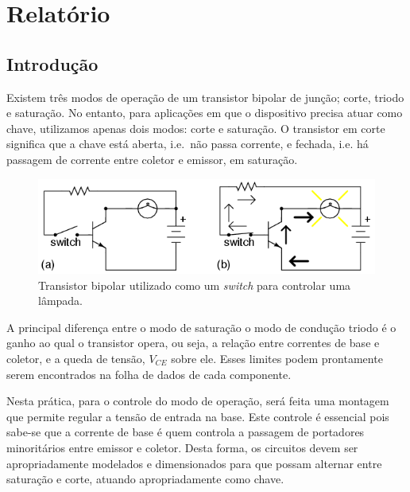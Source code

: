 \documentclass[12pt,a4paper]{article}
\begin{document}
\setcounter{figure}{1}
\setcounter{section}{2}
\setcounter{page}{6}
\section{Relatório}
\subsection{Introdução}
Existem três modos de operação de um transistor bipolar de junção; corte, triodo e saturação. No entanto, para aplicações 
em que o dispositivo precisa atuar como chave, utilizamos apenas dois modos: corte e saturação. O transistor em corte
significa que a chave está aberta, i.e.\ não passa corrente,  e fechada, i.e. há passagem de corrente entre coletor e emissor, em saturação.

\begin{figure}[htpb]
  \centering
  \includegraphics[width=0.8\linewidth]{./img/switch.png}
  \caption{Transistor bipolar utilizado como um \emph{switch} para controlar uma lâmpada.}
  \label{fig:divisortensao}
\end{figure}

A principal diferença entre o modo de saturação o modo de
condução triodo é o ganho ao qual o transistor opera, ou seja, a relação entre correntes de base e
coletor, e a queda de tensão, $V_{CE}$ sobre ele. Esses limites podem prontamente serem encontrados na folha de dados
de cada componente.

Nesta prática, para o controle do modo de operação, será feita uma montagem que permite regular
a tensão de entrada na base. Este controle é essencial pois sabe-se que a corrente de base é quem controla a passagem de portadores minoritários 
entre emissor e coletor. Desta forma, os circuitos devem ser apropriadamente modelados e dimensionados  para que possam alternar entre 
saturação e corte, atuando apropriadamente como chave.
\end{document}

